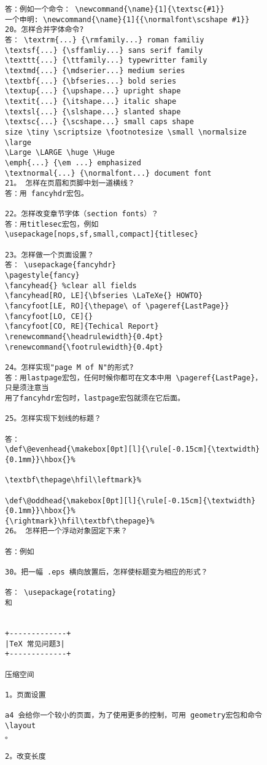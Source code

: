 \begin{center}
\begin{figure}[t]
\begin{verbatim}
答：例如一个命令： \newcommand{\name}{1]{\textsc{#1}} 
一个申明: \newcommand{\name}{1]{{\normalfont\scshape #1}} 
20。怎样合并字体命令? 
答： \textrm{...} {\rmfamily...} roman familiy 
\textsf{...} {\sffamliy...} sans serif family 
\texttt{...} {\ttfamily...} typewritter family 
\textmd{...} {\mdserier...} medium series 
\textbf{...} {\bfseries...} bold series 
\textup{...} {\upshape...} upright shape 
\textit{...} {\itshape...} italic shape 
\textsl{...} {\slshape...} slanted shape 
\textsc{...} {\scshape...} small caps shape 
size \tiny \scriptsize \footnotesize \small \normalsize \large 
\Large \LARGE \huge \Huge 
\emph{...} {\em ...} emphasized 
\textnormal{...} {\normalfont...} document font 
21。 怎样在页眉和页脚中划一道横线？ 
答：用 fancyhdr宏包。 
 
22。怎样改变章节字体（section fonts）？ 
答：用titlesec宏包，例如 
\usepackage[nops,sf,small,compact]{titlesec} 
 
23。怎样做一个页面设置？ 
答： \usepackage{fancyhdr} 
\pagestyle{fancy} 
\fancyhead{} %clear all fields 
\fancyhead[RO, LE]{\bfseries \LaTeXe{} HOWTO} 
\fancyfoot[LE, RO]{\thepage\ of \pageref{LastPage}} 
\fancyfoot[LO, CE]{} 
\fancyfoot[CO, RE]{Techical Report} 
\renewcommand{\headrulewidth}{0.4pt} 
\renewcommand{\footrulewidth}{0.4pt} 
 
24。怎样实现"page M of N"的形式? 
答：用lastpage宏包，任何时候你都可在文本中用 \pageref{LastPage}，只是须注意当 
用了fancyhdr宏包时，lastpage宏包就须在它后面。 
 
25。怎样实现下划线的标题？ 
 
答：  
\def\@evenhead{\makebox[0pt][l]{\rule[-0.15cm]{\textwidth}{0.1mm}}\hbox{}% 
 
\textbf\thepage\hfil\leftmark}% 
 
\def\@oddhead{\makebox[0pt][l]{\rule[-0.15cm]{\textwidth}{0.1mm}}\hbox{}% 
{\rightmark}\hfil\textbf\thepage}% 
26。 怎样把一个浮动对象固定下来？ 
 
答：例如 

30。把一幅 .eps 横向放置后，怎样使标题变为相应的形式？ 
 
答： \usepackage{rotating} 
和 

 
+-------------+ 
|TeX 常见问题3| 
+-------------+ 
 
压缩空间 
 
1。页面设置 
 
a4 会给你一个较小的页面，为了使用更多的控制，可用 geometry宏包和命令 \layout  
。 
 
2。改变长度 
 

\end{verbatim}
\end{figure}
\end{center}
